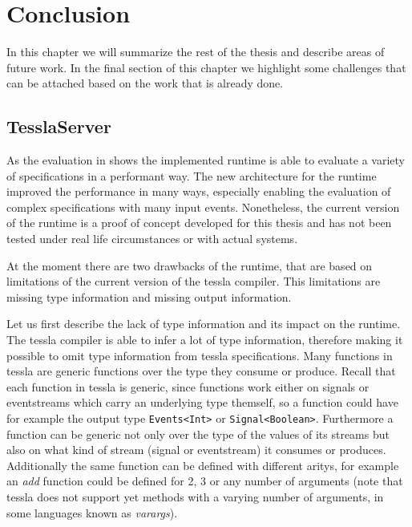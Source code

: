 %
\chapter{Conclusion}
\label{sec:conclusion}

In this chapter we will summarize the rest of the thesis and describe areas of future work.
In the final section of this chapter we highlight some challenges that can be attached based on the work that is already done.

\section{TesslaServer}

As the evaluation in  shows the implemented runtime is able to evaluate a variety of specifications in a performant way.
The new architecture for the runtime improved the performance in many ways, especially enabling the evaluation of complex specifications with many input events.
Nonetheless, the current version of the runtime is a proof of concept developed for this thesis and has not been tested under real life circumstances or with actual systems.

At the moment there are two drawbacks of the runtime, that are based on limitations of the current version of the \gls{tessla} compiler.
This limitations are missing type information and missing output information.

Let us first describe the lack of type information and its impact on the runtime.
The \gls{tessla} compiler is able to infer a lot of type information, therefore making it possible to omit type information from \gls{tessla} specifications.
Many functions in \gls{tessla} are generic functions over the type they consume or produce.
Recall that each function in \gls{tessla} is generic, since functions work either on signals or eventstreams which carry an underlying type themself, so a function could have for example the output type \lstinline{Events<Int>} or \lstinline{Signal<Boolean>}.
Furthermore a function can be generic not only over the type of the values of its streams but also on what kind of stream (signal or eventstream) it consumes or produces.
Additionally the same function can be defined with different aritys, for example an \emph{add} function could be defined for 2, 3 or any number of arguments (note that \gls{tessla} does not support yet methods with a varying number of arguments, in some languages known as \emph{varargs}).

